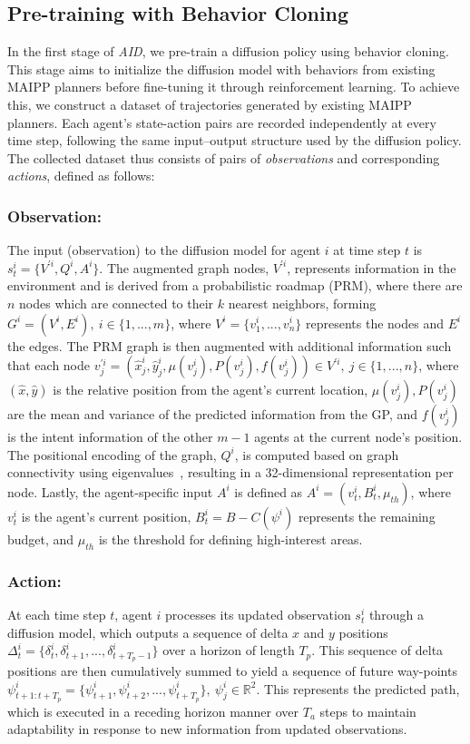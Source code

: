 \documentclass[runningheads]{llncs}
\begin{document}
\subsection{Pre-training with Behavior Cloning}
\label{sec: pretrain}
In the first stage of \textit{AID}, we pre-train a diffusion policy using behavior cloning. This stage aims to initialize the diffusion model with behaviors from existing MAIPP planners before fine-tuning it through reinforcement learning. To achieve this, we construct a dataset of trajectories generated by existing MAIPP planners. Each agent’s state-action pairs are recorded independently at every time step, following the same input–output structure used by the diffusion policy. The collected dataset thus consists of pairs of \textit{observations} and corresponding \textit{actions}, defined as follows:

\subsubsection{Observation:} The input (observation) to the diffusion model for agent $i$ at time step $t$ is $s^i_t = \{V^{'i}, Q^i, A^i\}$. The augmented graph nodes, $V^{'i}$, represents information in the environment and is derived from a probabilistic roadmap (PRM), where there are $n$ nodes which are connected to their $k$ nearest neighbors, forming $G^i = (V^i, E^i), \ i \in \{1, ..., m\}$, where $V^i = \{v^i_1, ..., v^i_n\}$ represents the nodes and $E^i$ the edges. The PRM graph is then augmented with additional information such that each node $v^{'i}_j = (\hat{x}^i_j, \hat{y}^i_j, \mu(v^i_j), P(v^i_j), f(v^i_j)) \in V^{'i}, \ j \in \{1, ..., n\}$, where $(\hat{x}, \hat{y})$ is the relative position from the agent's current location, $\mu(v^i_j), P(v^i_j)$ are the mean and variance of the predicted information from the GP, and $f(v^i_j)$ is the intent information of the other $m-1$ agents at the current node's position. The positional encoding of the graph, $Q^i$, is computed based on graph connectivity using eigenvalues~\cite{dwivedi2021generalization}, resulting in a 32-dimensional representation per node. Lastly, the agent-specific input $A^i$ is defined as $A^i = (v^i_t, B^i_t, \mu_{th})$, where $v^i_t$ is the agent’s current position, $B^i_t = B - C(\psi^i)$ represents the remaining budget, and $\mu_{th}$ is the threshold for defining high-interest areas.

\subsubsection{Action:} At each time step $t$, agent $i$ processes its updated observation $s^i_t$ through a diffusion model, which outputs a sequence of delta $x$ and $y$ positions $\Delta^i_t = \{\delta^i_t, \delta^i_{t+1}, ..., \delta^i_{t+T_p-1}\}$ over a horizon of length $T_p$. This sequence of delta positions are then cumulatively summed to yield a sequence of future way-points $\psi^i_{t+1:t+T_p} = \{\psi^i_{t+1}, \psi^i_{t+2}, ..., \psi^i_{t+T_p}\}, \ \psi^i_j \in \mathbb{R}^2$. This represents the predicted path, which is executed in a receding horizon manner over $T_a$ steps to maintain adaptability in response to new information from updated observations.
\end{document}

